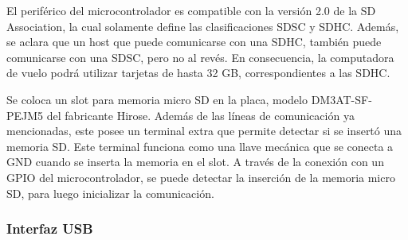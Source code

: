 El periférico del microcontrolador es compatible con la versión 2.0 de la SD Association, la cual solamente define las clasificaciones SDSC y SDHC. Además, se aclara que un host que puede comunicarse con una SDHC, también puede comunicarse con una SDSC, pero no al revés. En consecuencia, la computadora de vuelo podrá utilizar tarjetas de hasta 32 GB, correspondientes a las SDHC.


Se coloca un slot para memoria micro SD en la placa, modelo DM3AT-SF-PEJM5 del fabricante Hirose. Además de las líneas de comunicación ya mencionadas, este posee un terminal extra que permite detectar si se insertó una memoria SD. Este terminal funciona como una llave mecánica que se conecta a GND cuando se inserta la memoria en el slot. A través de la conexión con un GPIO del microcontrolador, se puede detectar la inserción de la memoria micro SD, para luego inicializar la comunicación. %



\subsubsection{Interfaz USB}

